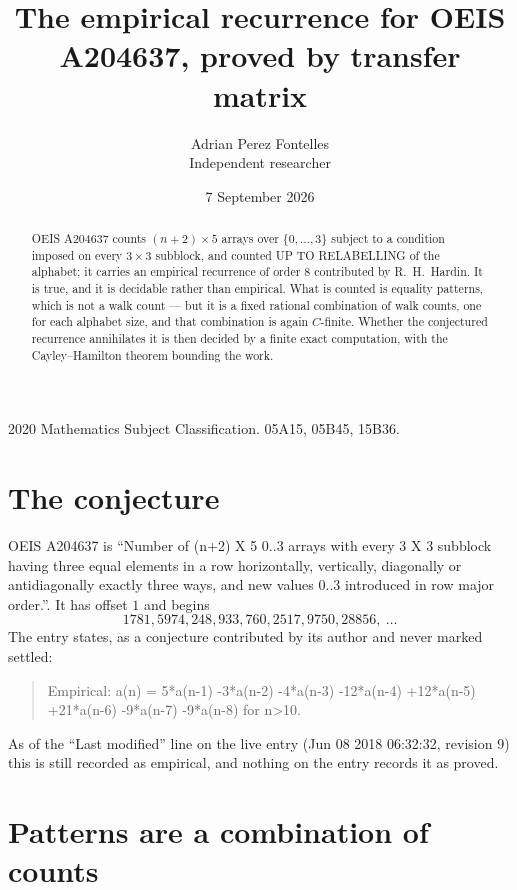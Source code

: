 \documentclass[11pt,a4paper]{article}
\title{The empirical recurrence for OEIS A204637, proved by transfer matrix}
\author{Adrian Perez Fontelles\\ \small Independent researcher}
\date{7 September 2026}
\theoremstyle{plain}
\theoremstyle{definition}
\begin{document}
\maketitle

\begin{abstract}
OEIS A204637 counts $(n+2)\times5$ arrays over $\{0,\dots,3\}$ subject to a condition imposed on
every $3\times3$ subblock, and counted UP TO RELABELLING of the
alphabet; it carries an empirical recurrence of order $8$ contributed by
R.~H.~Hardin. It is true, and it is decidable rather than empirical. What is counted is
equality patterns, which is not a walk count --- but it is a fixed rational combination of
walk counts, one for each alphabet size, and that combination is again $C$-finite. Whether the
conjectured recurrence annihilates it is then decided by a finite exact computation, with the
Cayley--Hamilton theorem bounding the work.
\end{abstract}

\noindent\small 2020 Mathematics Subject Classification. 05A15, 05B45, 15B36.\normalsize

\section{The conjecture}

OEIS A204637 is ``Number of (n+2) X 5 0..3 arrays with every 3 X 3 subblock having three equal elements in a row horizontally, vertically, diagonally or antidiagonally exactly three ways, and new values 0..3 introduced in row major order.''. It has offset $1$ and begins
\[
1781, 5974, 248, 933, 760, 2517, 9750, 28856,\ \dots
\]
The entry states, as a conjecture contributed by its author and never marked settled:
\begin{quote}
Empirical: a(n) = 5*a(n-1) -3*a(n-2) -4*a(n-3) -12*a(n-4) +12*a(n-5) +21*a(n-6) -9*a(n-7) -9*a(n-8) for n>10.
\end{quote}
As of the ``Last modified'' line on the live entry (Jun 08 2018 06:32:32, revision 9) this is still
recorded as empirical, and nothing on the entry records it as proved.

\section{Patterns are a combination of counts}
\end{document}
